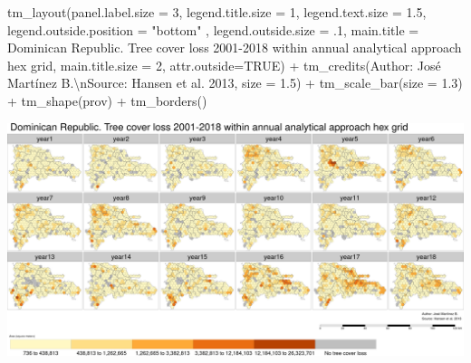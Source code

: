 \documentclass[10pt,landscape,a3paper]{article}
\newenvironment{Shaded}{\begin{snugshade}}{\end{snugshade}}
\newcommand{\AttributeTok}[1]{\textcolor[rgb]{0.77,0.63,0.00}{#1}}
\newcommand{\ConstantTok}[1]{\textcolor[rgb]{0.00,0.00,0.00}{#1}}
\newcommand{\DecValTok}[1]{\textcolor[rgb]{0.00,0.00,0.81}{#1}}
\newcommand{\FloatTok}[1]{\textcolor[rgb]{0.00,0.00,0.81}{#1}}
\newcommand{\FunctionTok}[1]{\textcolor[rgb]{0.00,0.00,0.00}{#1}}
\newcommand{\NormalTok}[1]{#1}
\newcommand{\SpecialCharTok}[1]{\textcolor[rgb]{0.00,0.00,0.00}{#1}}
\newcommand{\StringTok}[1]{\textcolor[rgb]{0.31,0.60,0.02}{#1}}
\begin{document}
\begin{Shaded}
\begin{Highlighting}[]
  \FunctionTok{tm\_layout}\NormalTok{(}\AttributeTok{panel.label.size =} \DecValTok{3}\NormalTok{, }\AttributeTok{legend.title.size =} \DecValTok{1}\NormalTok{, }\AttributeTok{legend.text.size =} \FloatTok{1.5}\NormalTok{,}
            \AttributeTok{legend.outside.position =} \StringTok{"bottom"}\NormalTok{ , }\AttributeTok{legend.outside.size =}\NormalTok{ .}\DecValTok{1}\NormalTok{,}
            \AttributeTok{main.title =} \StringTok{\textquotesingle{}Dominican Republic. Tree cover loss 2001{-}2018 within annual analytical approach hex grid\textquotesingle{}}\NormalTok{, }\AttributeTok{main.title.size =} \DecValTok{2}\NormalTok{, }\AttributeTok{attr.outside=}\ConstantTok{TRUE}\NormalTok{) }\SpecialCharTok{+} 
  \FunctionTok{tm\_credits}\NormalTok{(}\StringTok{\textquotesingle{}Author: José Martínez B.}\SpecialCharTok{\textbackslash{}n}\StringTok{Source: Hansen et al. 2013\textquotesingle{}}\NormalTok{, }\AttributeTok{size =} \FloatTok{1.5}\NormalTok{) }\SpecialCharTok{+}
  \FunctionTok{tm\_scale\_bar}\NormalTok{(}\AttributeTok{size =} \FloatTok{1.3}\NormalTok{) }\SpecialCharTok{+}
  \FunctionTok{tm\_shape}\NormalTok{(prov) }\SpecialCharTok{+} \FunctionTok{tm\_borders}\NormalTok{()}
\end{Highlighting}
\end{Shaded}

\begin{center}\includegraphics{img/data-download-preparation-eda/zonal-annual-grid-2} \end{center}
\end{document}
